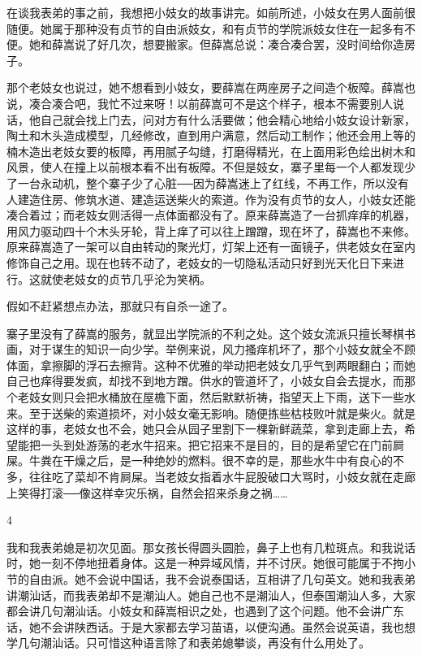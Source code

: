 在谈我表弟的事之前，我想把小妓女的故事讲完。如前所述，小妓女在男人面前很随便。她属于那种没有贞节的自由派妓女，和有贞节的学院派妓女住在一起多有不便。她和薛嵩说了好几次，想要搬家。但薛嵩总说：凑合凑合罢，没时间给你造房子。 

那个老妓女也说过，她不想看到小妓女，要薛嵩在两座房子之间造个板障。薛嵩也说，凑合凑合吧，我忙不过来呀！以前薛嵩可不是这个样子，根本不需要别人说话，他自己就会找上门去，问对方有什么活要做；他会精心地给小妓女设计新家，陶土和木头造成模型，几经修改，直到用户满意，然后动工制作；他还会用上等的楠木造出老妓女要的板障，再用腻子勾缝，打磨得精光，在上面用彩色绘出树木和风景，使人在撞上以前根本看不出有板障。不但是妓女，寨子里每一个人都发现少了一台永动机，整个寨子少了心脏──因为薛嵩迷上了红线，不再工作，所以没有人建造住房、修筑水道、建造运送柴火的索道。作为没有贞节的女人，小妓女还能凑合着过；而老妓女则活得一点体面都没有了。原来薛嵩造了一台抓痒痒的机器，用风力驱动四十个木头牙轮，背上痒了可以往上蹭蹭，现在坏了，薛嵩也不来修。原来薛嵩造了一架可以自由转动的聚光灯，灯架上还有一面镜子，供老妓女在室内修饰自己之用。现在也转不动了，老妓女的一切隐私活动只好到光天化日下来进行。这就使老妓女的贞节几乎沦为笑柄。 

假如不赶紧想点办法，那就只有自杀一途了。 

寨子里没有了薛嵩的服务，就显出学院派的不利之处。这个妓女流派只擅长琴棋书画，对于谋生的知识一向少学。举例来说，风力搔痒机坏了，那个小妓女就全不顾体面，拿擦脚的浮石去擦背。这种不优雅的举动把老妓女几乎气到两眼翻白；而她自己也痒得要发疯，却找不到地方蹭。供水的管道坏了，小妓女自会去提水，而那个老妓女则只会把水桶放在屋檐下面，然后默默祈祷，指望天上下雨，送下一些水来。至于送柴的索道损坏，对小妓女毫无影响。随便拣些枯枝败叶就是柴火。就是这样的事，老妓女也不会，她只会从园子里割下一棵新鲜蔬菜，拿到走廊上去，希望能把一头到处游荡的老水牛招来。把它招来不是目的，目的是希望它在门前屙屎。牛粪在干燥之后，是一种绝妙的燃料。很不幸的是，那些水牛中有良心的不多，往往吃了菜却不肯屙屎。当老妓女指着水牛屁股破口大骂时，小妓女就在走廊上笑得打滚──像这样幸灾乐祸，自然会招来杀身之祸…… 

4 

我和我表弟媳是初次见面。那女孩长得圆头圆脸，鼻子上也有几粒斑点。和我说话时，她一刻不停地扭着身体。这是一种异域风情，并不讨厌。她很可能属于不拘小节的自由派。她不会说中国话，我不会说泰国话，互相讲了几句英文。她和我表弟讲潮汕话，而我表弟却不是潮汕人。她自己也不是潮汕人，但泰国潮汕人多，大家都会讲几句潮汕话。小妓女和薛嵩相识之处，也遇到了这个问题。他不会讲广东话，她不会讲陕西话。于是大家都去学习苗语，以便沟通。虽然会说英语，我也想学几句潮汕话。只可惜这种语言除了和表弟媳攀谈，再没有什么用处了。 

